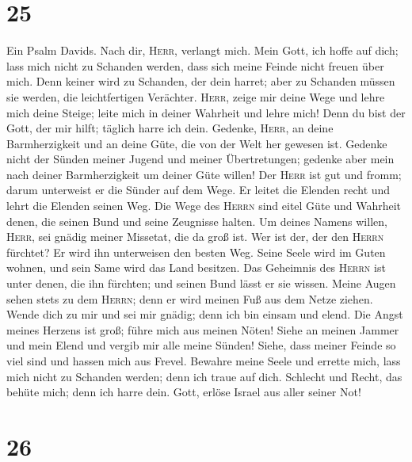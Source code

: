 \hypertarget{section-24}{%
\section{25}\label{section-24}}

 Ein Psalm Davids. Nach dir, \textsc{Herr}, verlangt mich.
 Mein Gott, ich hoffe auf dich; lass mich nicht zu
Schanden werden, dass sich meine Feinde nicht freuen über mich.
 Denn keiner wird zu Schanden, der dein harret; aber zu
Schanden müssen sie werden, die leichtfertigen Verächter. 
\textsc{Herr}, zeige mir deine Wege und lehre mich deine Steige;
 leite mich in deiner Wahrheit und lehre mich! Denn du
bist der Gott, der mir hilft; täglich harre ich dein. 
Gedenke, \textsc{Herr}, an deine Barmherzigkeit und an deine Güte, die
von der Welt her gewesen ist.  Gedenke nicht der Sünden
meiner Jugend und meiner Übertretungen; gedenke aber mein nach deiner
Barmherzigkeit um deiner Güte willen!  Der \textsc{Herr}
ist gut und fromm; darum unterweist er die Sünder auf dem Wege.
 Er leitet die Elenden recht und lehrt die Elenden seinen
Weg.  Die Wege des \textsc{Herrn} sind eitel Güte und
Wahrheit denen, die seinen Bund und seine Zeugnisse halten.
 Um deines Namens willen, \textsc{Herr}, sei gnädig
meiner Missetat, die da groß ist.  Wer ist der, der den
\textsc{Herrn} fürchtet? Er wird ihn unterweisen den besten Weg.
 Seine Seele wird im Guten wohnen, und sein Same wird das
Land besitzen.  Das Geheimnis des \textsc{Herrn} ist
unter denen, die ihn fürchten; und seinen Bund lässt er sie wissen.
 Meine Augen sehen stets zu dem \textsc{Herrn}; denn er
wird meinen Fuß aus dem Netze ziehen.  Wende dich zu mir
und sei mir gnädig; denn ich bin einsam und elend.  Die
Angst meines Herzens ist groß; führe mich aus meinen Nöten!
 Siehe an meinen Jammer und mein Elend und vergib mir
alle meine Sünden!  Siehe, dass meiner Feinde so viel
sind und hassen mich aus Frevel.  Bewahre meine Seele und
errette mich, lass mich nicht zu Schanden werden; denn ich traue auf
dich.  Schlecht und Recht, das behüte mich; denn ich
harre dein.  Gott, erlöse Israel aus aller seiner Not!

\hypertarget{section-25}{%
\section{26}\label{section-25}}


